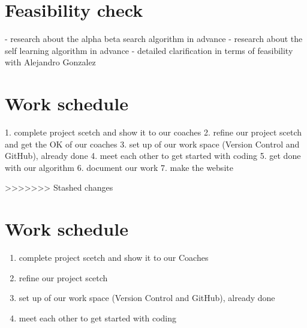 \section{Feasibility check}
- research about the alpha beta search algorithm in advance
- research about the self learning algorithm in advance
- detailed clarification in terms of feasibility with Alejandro Gonzalez

\section{Work schedule}
1. complete project scetch and show it to our coaches
2. refine our project scetch and get the OK of our coaches
3. set up of our work space (Version Control and GitHub), already done
4. meet each other to get started with coding
5. get done with our algorithm
6. document our work
7. make the website

>>>>>>> Stashed changes

\section{Work schedule}
\begin{enumerate}
    \item complete project scetch and show it to our Coaches
    \item refine our project scetch
    \item set up of our work space (Version Control and GitHub), already done
    \item meet each other to get started with coding
\end{enumerate}

